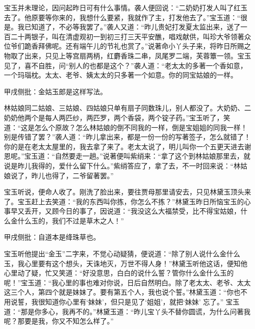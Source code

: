 \begin{parag}
    宝玉并未理论，因问起昨日可有什么事情。袭人便回说：“二奶奶打发人叫了红玉去了。他原要等你来的，我想什么要紧，我就作了主，打发他去了。”宝玉道：“很是。我已知道了，不必等我罢了。”袭人又道：“昨儿贵妃打发夏太监出来，送了一百二十两银子，叫在清虚观初一到初三打三天平安醮，唱戏献供，叫珍大爷领著众位爷们跪香拜佛呢。还有端午儿的节礼也赏了。”说著命小丫头子来，将昨日所赐之物取了出来，只见上等宫扇两柄，红麝香珠二串，凤尾罗二端，芙蓉簟一领。宝玉见了，喜不自胜，问“别人的也都是这个？”袭人道：“老太太的多著一个香如意，一个玛瑙枕。太太、老爷、姨太太的只多著一个如意。你的同宝姑娘的一样。\begin{note}甲戌侧批：金姑玉郎是这样写法。\end{note}林姑娘同二姑娘、三姑娘、四姑娘只单有扇子同数珠儿，别人都没了。大奶奶、二奶奶他两个是每人两匹纱，两匹罗，两个香袋，两个锭子药。”宝玉听了，笑道：“这是怎么个原故？怎么林姑娘的倒不同我的一样，倒是宝姐姐的同我一样！别是传错了罢？”袭人道：“昨儿拿出来，都是一份一份的写著签子，怎么就错了！你的是在老太太屋里的，我去拿了来了。老太太说了，明儿叫你一个五更天进去谢恩呢。”宝玉道：“自然要走一趟。”说著便叫紫绡来：“拿了这个到林姑娘那里去，就说是昨儿我得的，爱什么留下什么。”紫绡答应了，拿了去，不一时回来说：“林姑娘说了，昨儿也得了，二爷留著罢。”
\end{parag}


\begin{parag}
    宝玉听说，便命人收了。刚洗了脸出来，要往贾母那里请安去，只见林黛玉顶头来了。宝玉赶上去笑道：“我的东西叫你拣，你怎么不拣？”林黛玉昨日所恼宝玉的心事早又丢开，又顾今日的事了，因说道：“我没这么大福禁受，比不得宝姑娘，什么金什么玉的，我们不过是草木之人！”\begin{note}甲戌侧批：自道本是绛珠草也。\end{note}宝玉听他提出“金玉”二字来，不觉心动疑猜，便说道：“除了别人说什么金什么玉，我心里要有这个想头，天诛地灭，万世不得人身！”林黛玉听他这话，便知他心里动了疑，忙又笑道：“好没意思，白白的说什么誓？管你什么金什么玉的呢！”宝玉道：“我心里的事也难对你说，日后自然明白。除了老太太、老爷、太太这三个人，第四个就是妹妹了。要有第五个人，我也说个誓。”林黛玉道：“你也不用说誓，我很知道你心里有‘妹妹’，但只是见了‘姐姐’，就把‘妹妹’ 忘了。” 宝玉道：“那是你多心，我再不的。”林黛玉道：“昨儿宝丫头不替你圆谎，为什么问著我呢？那要是我，你又不知怎么样了。”
\end{parag}


